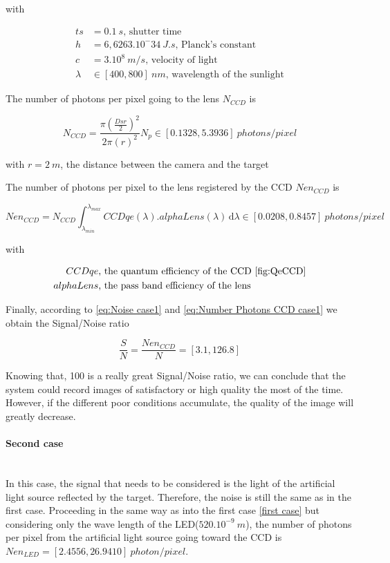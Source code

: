 with

\begin{align*}
ts & = 0.1\ s \mbox{, shutter time}  \\
h & = 6,6263.10^-34 \ J.s \mbox{, Planck's constant}  \\
c & = 3.10^8 \ m/s \mbox{, velocity of light} \\
\lambda & \in [400, 800] \ nm \mbox{, wavelength of the sunlight}
\end{align*}

The number of photons per pixel going to the lens $N_{CCD}$ is

\begin{equation}
\label{eq:Number Photons case1}
N_{CCD}=\frac{\pi\left(\frac{Dsr}{2}\right)^2}{2\pi(r)^2}N_p \in [0.1328, 5.3936] \ photons/pixel
\end{equation}

with $r = 2\ m$, the distance between the camera and the target

The number of photons per pixel to the lens registered by the CCD $Nen_{CCD}$ is

\begin{equation}
\label{eq:Number Photons CCD case1}
Nen_{CCD}= N_{CCD}\int_{\lambda_{min}}^{\lambda_{max}}CCDqe(\lambda).alphaLens(\lambda) \, \mathrm d\lambda \in [0.0208, 0.8457] \ photons/pixel
\end{equation}

with

\begin{align*}
CCDqe & \mbox{, the quantum efficiency of the CCD \ref{fig:QeCCD}}\\
alphaLens & \mbox{, the pass band efficiency of the lens}
\end{align*}

Finally, according to \eqref{eq:Noise case1} and \eqref{eq:Number Photons CCD case1} we obtain the Signal/Noise ratio 

\begin{equation}
\label{eq:Signal Noise Ratio case1}
\frac{S}{N} = \frac{Nen_{CCD}}{N} = [3.1, 126.8]
\end{equation}

Knowing that, 100 is a really great Signal/Noise ratio, we can conclude that the system could record images of satisfactory or high quality the most of the time. However, if the different poor conditions accumulate, the quality of the image will greatly decrease.

\paragraph*{Second case}
~~\\
In this case, the signal that needs to be considered is the light of the artificial light source reflected by the target. Therefore, the noise is still the same as in the first case.
Proceeding in the same way as into the first case \ref{first case} but considering only the wave length of the LED($520.10^{-9}\ m$), the number of photons per pixel from the artificial light source going toward the CCD is $Nen_{LED} = [2.4556, 26.9410]\ photon/pixel$.

